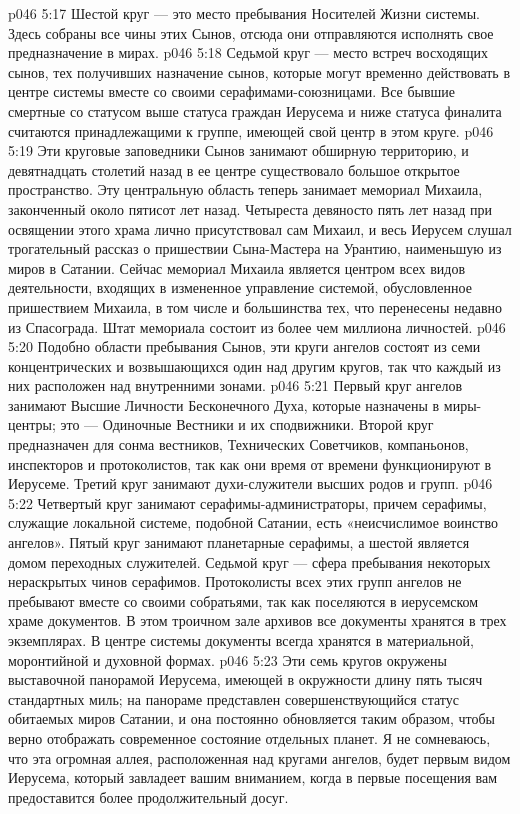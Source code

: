 \vs p046 5:17 Шестой круг --- это место пребывания Носителей Жизни системы. Здесь собраны все чины этих Сынов, отсюда они отправляются исполнять свое предназначение в мирах.
\vs p046 5:18 Седьмой круг --- место встреч восходящих сынов, тех получивших назначение сынов, которые могут временно действовать в центре системы вместе со своими серафимами\hyp{}союзницами. Все бывшие смертные со статусом выше статуса граждан Иерусема и ниже статуса финалита считаются принадлежащими к группе, имеющей свой центр в этом круге.
\vs p046 5:19 Эти круговые заповедники Сынов занимают обширную территорию, и девятнадцать столетий назад в ее центре существовало большое открытое пространство. Эту центральную область теперь занимает мемориал Михаила, законченный около пятисот лет назад. Четыреста девяносто пять лет назад при освящении этого храма лично присутствовал сам Михаил, и весь Иерусем слушал трогательный рассказ о пришествии Сына\hyp{}Мастера на Урантию, наименьшую из миров в Сатании. Сейчас мемориал Михаила является центром всех видов деятельности, входящих в измененное управление системой, обусловленное пришествием Михаила, в том числе и большинства тех, что перенесены недавно из Спасограда. Штат мемориала состоит из более чем миллиона личностей.
\vs p046 5:20 \pc {}\bibnobreakspace {} Подобно области пребывания Сынов, эти круги ангелов состоят из семи концентрических и возвышающихся один над другим кругов, так что каждый из них расположен над внутренними зонами.
\vs p046 5:21 \pc Первый круг ангелов занимают Высшие Личности Бесконечного Духа, которые назначены в миры\hyp{}центры; это --- Одиночные Вестники и их сподвижники. Второй круг предназначен для сонма вестников, Технических Советчиков, компаньонов, инспекторов и протоколистов, так как они время от времени функционируют в Иерусеме. Третий круг занимают духи\hyp{}служители высших родов и групп.
\vs p046 5:22 Четвертый круг занимают серафимы\hyp{}администраторы, причем серафимы, служащие локальной системе, подобной Сатании, есть «неисчислимое воинство ангелов». Пятый круг занимают планетарные серафимы, а шестой является домом переходных служителей. Седьмой круг --- сфера пребывания некоторых нераскрытых чинов серафимов. Протоколисты всех этих групп ангелов не пребывают вместе со своими собратьями, так как поселяются в иерусемском храме документов. В этом троичном зале архивов все документы хранятся в трех экземплярах. В центре системы документы всегда хранятся в материальной, моронтийной и духовной формах.
\vs p046 5:23 Эти семь кругов окружены выставочной панорамой Иерусема, имеющей в окружности длину пять тысяч стандартных миль; на панораме представлен совершенствующийся статус обитаемых миров Сатании, и она постоянно обновляется таким образом, чтобы верно отображать современное состояние отдельных планет. Я не сомневаюсь, что эта огромная аллея, расположенная над кругами ангелов, будет первым видом Иерусема, который завладеет вашим вниманием, когда в первые посещения вам предоставится более продолжительный досуг.
